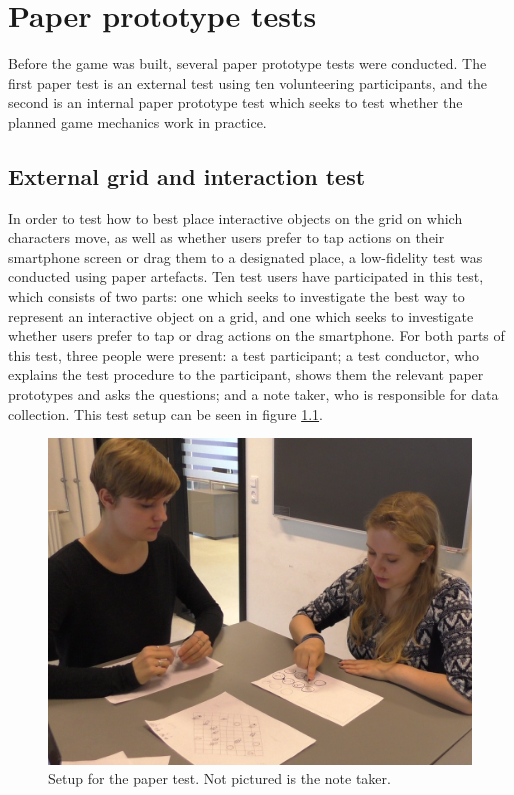\chapter{Paper prototype tests}\label{ch:paperPlaytest}
Before the game was built, several paper prototype tests were conducted. The first paper test is an external test using ten volunteering participants, and the second is an internal paper prototype test which seeks to test whether the planned game mechanics work in practice.

\section{External grid and interaction test}
In order to test how to best place interactive objects on the grid on which characters move, as well as whether users prefer to tap actions on their smartphone screen or drag them to a designated place, a low-fidelity test was conducted using paper artefacts. Ten test users have participated in this test, which consists of two parts: one which seeks to investigate the best way to represent an interactive object on a grid, and one which seeks to investigate whether users prefer to tap or drag actions on the smartphone. For both parts of this test, three people were present: a test participant; a test conductor, who explains the test procedure to the participant, shows them the relevant paper prototypes and asks the questions; and a note taker, who is responsible for data collection. This test setup can be seen in figure \ref{fig:papersetup}.

\begin{figure}[h!]
	\centering
	\includegraphics[width=\textwidth / 2]{figures/PaperTestSetup.png}
	\caption{Setup for the paper test. Not pictured is the note taker. \label{fig:papersetup}}
\end{figure}

